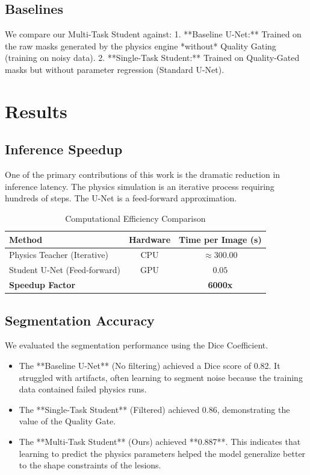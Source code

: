 \documentclass[journal]{IEEEtran}
\begin{document}
\subsection{Baselines}
We compare our Multi-Task Student against:
1.  **Baseline U-Net:** Trained on the raw masks generated by the physics engine *without* Quality Gating (training on noisy data).
2.  **Single-Task Student:** Trained on Quality-Gated masks but without parameter regression (Standard U-Net).

\section{Results}

\subsection{Inference Speedup}
One of the primary contributions of this work is the dramatic reduction in inference latency. The physics simulation is an iterative process requiring hundreds of steps. The U-Net is a feed-forward approximation.
\begin{table}[h]
\centering
\caption{Computational Efficiency Comparison}
\begin{tabular}{lcc}
\toprule
Method & Hardware & Time per Image (s) \\
\midrule
Physics Teacher (Iterative) & CPU & $\approx 300.00$ \\
Student U-Net (Feed-forward) & GPU & $\mathbf{0.05}$ \\
\midrule
\textbf{Speedup Factor} & & \textbf{6000x} \\
\bottomrule
\end{tabular}
\end{table}

\subsection{Segmentation Accuracy}
We evaluated the segmentation performance using the Dice Coefficient.
\begin{itemize}
    \item The **Baseline U-Net** (No filtering) achieved a Dice score of 0.82. It struggled with artifacts, often learning to segment noise because the training data contained failed physics runs.
    \item The **Single-Task Student** (Filtered) achieved 0.86, demonstrating the value of the Quality Gate.
    \item The **Multi-Task Student** (Ours) achieved **0.887**. This indicates that learning to predict the physics parameters helped the model generalize better to the shape constraints of the lesions.
\end{itemize}
\end{document}
